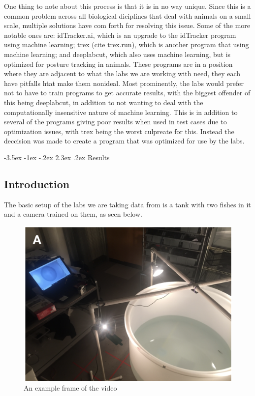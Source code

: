 \documentclass{article}
\makeatletter
\renewcommand\section{\clearpage\newpage\@startsection {section}{1}{\z@}%
	{-3.5ex \@plus -1ex \@minus -.2ex}%
	{2.3ex \@plus.2ex}%
	{\normalfont\Large\bfseries}}
\makeatother
\begin{document}
One thing to note about this process is that it is in no way unique. Since this is a common problem across all biological diciplines that deal with animals on a small scale, multiple solutions have com forth for resolving this issue. Some of the more notable ones are: idTracker.ai, which is an upgrade to the idTracker program using machine learning; trex (cite trex.run), which is another program that using machine learning; and deeplabcut, which also uses machine learning, but is optimized for posture tracking in animals. These programs are in a position where they are adjacent to what the labs we are working with need, they each have pitfalls htat make them nonideal. Most prominently, the labs would prefer not to have to train programs to get accurate results, with the biggest offender of this being deeplabcut, in addition to not wanting to deal with the computationally insensitive nature of machine learning. This is in addition to several of the programs giving poor results when used in test cases due to optimization issues, with trex being the worst culpreate for this. Instead the deccision was made to create a program that was optimized for use by the labs.


\section{Results}

\subsection{Introduction}

The basic setup of the labs we are taking data from is a tank with two fishes in it and a camera trained on them, as seen below.

\begin{figure}[H]
	\centering
	\includegraphics[width=.5\linewidth]{experimental_design}
	\caption{An example frame of the video}
\end{figure}
\end{document}
